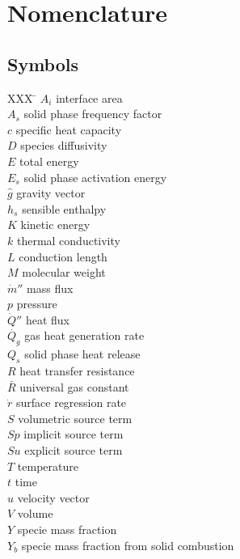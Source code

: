 \documentclass{article}
\renewcommand{\vec}[1]{\ensuremath{\hat{#1}}}
\begin{document}
  \section*{Nomenclature}
    \begin{multicols}{2}
      \subsection*{Symbols}
        \begin{tabbing}
          XXX \= \kill
          $A_i$ \> interface area \\
          $A_s$ \> solid phase frequency factor \\
          $c$ \>  specific heat capacity \\
          $D$ \> species diffusivity \\
          $E$ \> total energy \\
          $E_s$ \> solid phase activation energy \\
          $\vec{g}$ \> gravity vector \\
          $h_s$ \> sensible enthalpy \\
          $K$ \> kinetic energy \\
          $k$ \> thermal conductivity \\
          $L$ \> conduction length \\
          $M$ \> molecular weight \\
          $\dot{m}''$ \> mass flux \\
          $p$ \> pressure \\
          $\dot{Q}''$ \> heat flux \\
          $\dot{Q_g}$ \> gas heat generation rate \\
          $Q_s$ \> solid phase heat release \\
          $R$ \> heat transfer resistance \\
          $\bar{R}$ \> universal gas constant \\
          $\dot{r}$ \> surface regression rate \\
          $S$ \> volumetric source term \\
          $Sp$ \> implicit source term \\
          $Su$ \> explicit source term \\
          $T$ \> temperature \\
          $t$ \> time \\
          $\vec{u}$ \> velocity vector \\
          $V$ \> volume \\
          $Y$ \> specie mass fraction \\
          $Y_b$ \> specie mass fraction from solid combustion
        \end{tabbing}

\end{multicols}
\end{document}
